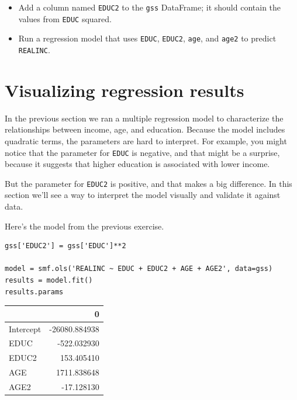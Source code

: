 \begin{itemize}
\item
  Add a column named \passthrough{\lstinline!EDUC2!} to the
  \passthrough{\lstinline!gss!} DataFrame; it should contain the values
  from \passthrough{\lstinline!EDUC!} squared.
\item
  Run a regression model that uses \passthrough{\lstinline!EDUC!},
  \passthrough{\lstinline!EDUC2!}, \passthrough{\lstinline!age!}, and
  \passthrough{\lstinline!age2!} to predict
  \passthrough{\lstinline!REALINC!}.
\end{itemize}

\hypertarget{visualizing-regression-results}{%
\section{Visualizing regression
results}\label{visualizing-regression-results}}

In the previous section we ran a multiple regression model to
characterize the relationships between income, age, and education.
Because the model includes quadratic terms, the parameters are hard to
interpret. For example, you might notice that the parameter for
\passthrough{\lstinline!EDUC!} is negative, and that might be a
surprise, because it suggests that higher education is associated with
lower income.

But the parameter for \passthrough{\lstinline!EDUC2!} is positive, and
that makes a big difference. In this section we'll see a way to
interpret the model visually and validate it against data.

Here's the model from the previous exercise.

\begin{lstlisting}[]
gss['EDUC2'] = gss['EDUC']**2

model = smf.ols('REALINC ~ EDUC + EDUC2 + AGE + AGE2', data=gss)
results = model.fit()
results.params
\end{lstlisting}

\begin{tabular}{lr}
\midrule
{} &             0 \\
\midrule
Intercept & -26080.884938 \\
EDUC      &   -522.032930 \\
EDUC2     &    153.405410 \\
AGE       &   1711.838648 \\
AGE2      &    -17.128130 \\
\midrule
\end{tabular}

